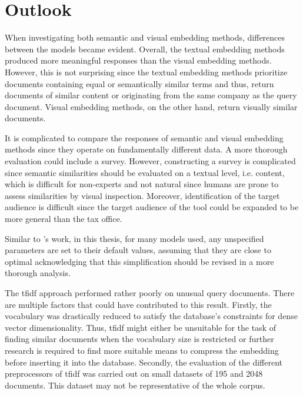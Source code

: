 \section{Outlook}\label{sec:outlook}

When investigating both semantic and visual embedding methods, differences between the models became evident.
Overall, the textual embedding methods produced more meaningful responses than the visual embedding methods.
However, this is not surprising since the textual embedding methods prioritize documents containing equal or semantically similar terms and thus,
return documents of similar content or originating from the same company as the query document.
Visual embedding methods, on the other hand, return visually similar documents.

It is complicated to compare the responses of semantic and visual embedding methods since they operate on fundamentally different data.
A more thorough evaluation could include a survey.
However, constructing a survey is complicated since semantic similarities should be evaluated on a textual level, i.e. content, 
which is difficult for non-experts and not natural since humans are prone to assess similarities by visual inspection.
Moreover, identification of the target audience is difficult since the target audience of the tool could be expanded to be more general than the tax office.


Similar to \citeauthor{glove2014}'s work, in this thesis, for many models used, any unspecified parameters are set to their default values, 
assuming that they are close to optimal
acknowledging that this simplification should be revised in a more thorough analysis.

The \ac{tfidf} approach performed rather poorly on unusual query documents.
There are multiple factors that could have contributed to this result.
Firstly, the vocabulary was drastically reduced to satisfy the database's constraints for dense vector dimensionality.
Thus, \ac{tfidf} might either be unsuitable for the task of finding similar documents when the vocabulary size is restricted or 
further research is required to find more suitable means to compress the embedding before inserting it into the database.
Secondly, the evaluation of the different preprocessors of \ac{tfidf} was carried out on small datasets of 195 and 2048 documents.
This dataset may not be representative of the whole corpus.

